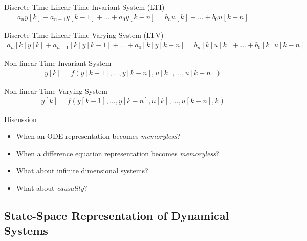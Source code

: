 \documentclass[twoside]{article}
\begin{document}
\begin{itemize}
\vspace{12pt}

Discrete-Time Linear Time Invariant System (LTI)
%
\begin{align*}
a_n  y[k] + a_{n-1}  y[k-1] + ... + a_0 y[k-n] = b_{n}  u[k] + ... + b_0 u[k-n]
\end{align*}

\vspace{12pt}

Discrete-Time Linear Time Varying System (LTV)
%
\begin{align*}
a_n[k]  y[k] + a_{n-1}[k] y[k-1] + ... + a_0[k] y[k-n] = b_{n}[k]  u[k] + ... + b_0[k] u[k-n]
\end{align*}

\vspace{12pt}

Non-linear Time Invariant System
%
\begin{align*}
y[k] = f(y[k-1], ..., y[k-n], u[k],  ... , u[k-n])
\end{align*}

\vspace{12pt}

Non-linear Time Varying System
%
\begin{align*}
y[k] = f(y[k-1], ..., y[k-n], u[k],  ... , u[k-n],k)
\end{align*}

\vspace{12pt}

\end{itemize}

\vspace{12pt}

Discussion 

\vspace{6pt}

\begin{itemize}
  \item When an ODE representation becomes \textit{memoryless}?
  \item When a difference equation representation becomes \textit{memoryless}?
  \item What about infinite dimensional systems?
  \item What about \textit{causality}?    
\end{itemize}

\subsection{State-Space Representation of Dynamical Systems}
\end{document}
